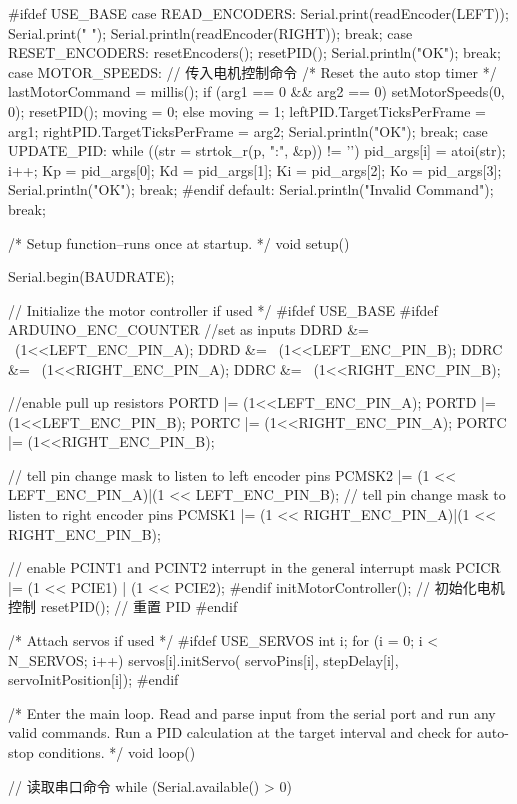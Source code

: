 \documentclass[openany, fontset=windowsold]{ctexbook}
\theoremstyle{kaiti}
\theoremstyle{normal}
\begin{document}
\begin{cpp}
{{  #ifdef USE_BASE
    case READ_ENCODERS:
      Serial.print(readEncoder(LEFT));
      Serial.print(" ");
      Serial.println(readEncoder(RIGHT));
      break;
    case RESET_ENCODERS:
      resetEncoders();
      resetPID();
      Serial.println("OK");
      break;
    case MOTOR_SPEEDS: // 传入电机控制命令
      /* Reset the auto stop timer */
      lastMotorCommand = millis();
      if (arg1 == 0 && arg2 == 0) {
        setMotorSpeeds(0, 0);
        resetPID();
        moving = 0;
      }
      else moving = 1;
      leftPID.TargetTicksPerFrame = arg1;
      rightPID.TargetTicksPerFrame = arg2;
      Serial.println("OK"); 
      break;
    case UPDATE_PID:
      while ((str = strtok_r(p, ":", &p)) != '\0') {
        pid_args[i] = atoi(str);
        i++;
      }
      Kp = pid_args[0];
      Kd = pid_args[1];
      Ki = pid_args[2];
      Ko = pid_args[3];
      Serial.println("OK");
      break;
  #endif
    default:
      Serial.println("Invalid Command");
      break;
    }
  }

  /* Setup function--runs once at startup. */
  void setup() {
    Serial.begin(BAUDRATE);

  // Initialize the motor controller if used */
  #ifdef USE_BASE
    #ifdef ARDUINO_ENC_COUNTER
      //set as inputs
      DDRD &= ~(1<<LEFT_ENC_PIN_A);
      DDRD &= ~(1<<LEFT_ENC_PIN_B);
      DDRC &= ~(1<<RIGHT_ENC_PIN_A);
      DDRC &= ~(1<<RIGHT_ENC_PIN_B);

      //enable pull up resistors
      PORTD |= (1<<LEFT_ENC_PIN_A);
      PORTD |= (1<<LEFT_ENC_PIN_B);
      PORTC |= (1<<RIGHT_ENC_PIN_A);
      PORTC |= (1<<RIGHT_ENC_PIN_B);

      // tell pin change mask to listen to left encoder pins
      PCMSK2 |= (1 << LEFT_ENC_PIN_A)|(1 << LEFT_ENC_PIN_B);
      // tell pin change mask to listen to right encoder pins
      PCMSK1 |= (1 << RIGHT_ENC_PIN_A)|(1 << RIGHT_ENC_PIN_B);

      // enable PCINT1 and PCINT2 interrupt in the general interrupt mask
      PCICR |= (1 << PCIE1) | (1 << PCIE2);
    #endif
    initMotorController(); // 初始化电机控制
    resetPID(); // 重置 PID
  #endif

  /* Attach servos if used */
    #ifdef USE_SERVOS
      int i;
      for (i = 0; i < N_SERVOS; i++) {
        servos[i].initServo(
            servoPins[i],
            stepDelay[i],
            servoInitPosition[i]);
      }
    #endif
  }

  /* Enter the main loop.  Read and parse input from the serial port
    and run any valid commands. Run a PID calculation at the target
    interval and check for auto-stop conditions.
  */
  void loop() {
    // 读取串口命令
    while (Serial.available() > 0) {

}}
\end{cpp}
\end{document}
